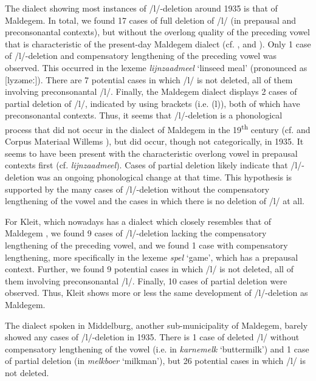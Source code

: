 \documentclass[output=paper,hidelinks,draftmode]{langscibook}
\begin{document}
The dialect showing most instances of /l/-deletion around 1935 is that of Maldegem. In total, we found 17 cases of full deletion of /l/ (in prepausal and preconsonantal contexts), but without the overlong quality of the preceding vowel that is characteristic of the present-day Maldegem dialect (cf. \citealt{Taeldeman1966, Versieck1989}, and \citealt{Rys2007}). Only 1 case of /l/-deletion and compensatory lengthening of the preceding vowel was observed. This occurred in the lexeme \textit{lijnzaadmeel} ‘linseed meal’ (pronounced as [lyzəmeː]). There are 7 potential cases in which /l/ is not deleted, all of them involving preconsonantal /l/. Finally, the Maldegem dialect displays 2 cases of partial deletion of /l/, indicated by using brackets (i.e. (l)), both of which have preconsonantal contexts. Thus, it seems that /l/-deletion is a phonological process that did not occur in the dialect of Maldegem in the 19\textsuperscript{th} century (cf. \citealt{Winkler1874} and Corpus Materiaal Willems \citeyear{PieterWillems}), but did occur, though not categorically, in 1935. It seems to have been present with the characteristic overlong vowel in prepausal contexts first (cf. \textit{lijnzaadmeel}). Cases of partial deletion likely indicate that /l/-deletion was an ongoing phonological change at that time. This hypothesis is supported by the many cases of /l/-deletion without the compensatory lengthening of the vowel and the cases in which there is no deletion of /l/ at all. 

For Kleit, which nowadays has a dialect which closely resembles that of Maldegem \citep{Taeldeman1966}, we found 9 cases of /l/-deletion lacking the compensatory lengthening of the preceding vowel, and we found 1 case with compensatory lengthening, more specifically in the lexeme \textit{spel} ‘game’, which has a prepausal context. Further, we found 9 potential cases in which /l/ is not deleted, all of them involving preconsonantal /l/. Finally, 10 cases of partial deletion were observed. Thus, Kleit shows more or less the same development of /l/-deletion as Maldegem.

The dialect spoken in  Middelburg, another sub-municipality of Maldegem, barely showed any cases of /l/-deletion in 1935. There is 1 case of deleted /l/ without compensatory lengthening of the vowel (i.e. in \textit{karnemelk} ‘buttermilk’) and 1 case of partial deletion (in \textit{melkboer} ‘milkman’), but 26 potential cases in which /l/ is not deleted.
\end{document}

